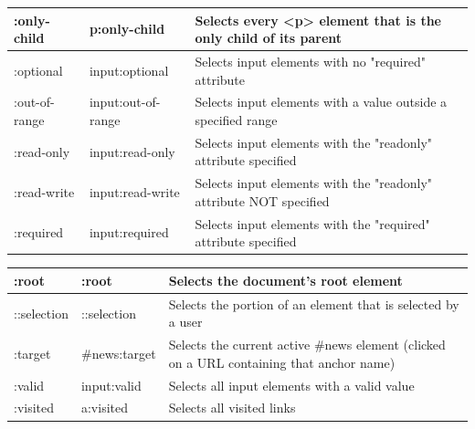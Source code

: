 \documentclass[11pt]{article}
\begin{document}
\begin{tabularx}{\textwidth}{|p{} | p{} | X|}
				\hline
				:only-child & p:only-child & Selects every <p> element that is the only child of its parent \\
				\hline
				:optional & input:optional & Selects input elements with no "required" attribute \\
				\hline
				:out-of-range & input:out-of-range & Selects input elements with a value outside a specified range \\
				\hline
				:read-only & input:read-only & Selects input elements with the "readonly" attribute specified \\
				\hline
				:read-write & input:read-write & Selects input elements with the "readonly" attribute NOT specified \\
				\hline
				:required & input:required & Selects input elements with the "required" attribute specified \\
				\hline
			\end{tabularx}
			\begin{tabularx}{\textwidth}{|p{} | p{} | X|}
				\hline
				:root & :root & Selects the document's root element \\
				\hline
				::selection & ::selection & Selects the portion of an element that is selected by a user  \\
				\hline
				:target & \#news:target & Selects the current active \#news element (clicked on a URL containing that anchor name) \\
				\hline
				:valid & input:valid & Selects all input elements with a valid value \\
				\hline
				:visited & a:visited & Selects all visited links \\
				\hline
			\end{tabularx}
			
			
\end{document}
